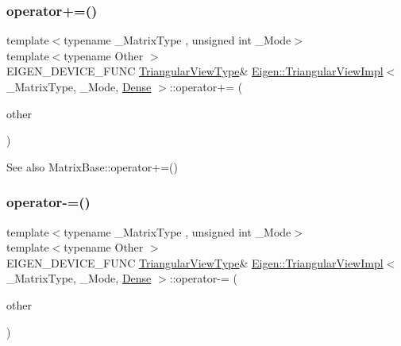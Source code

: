 \subsubsection{\texorpdfstring{operator+=()}{operator+=()}}
{\footnotesize\ttfamily template$<$typename \+\_\+\+Matrix\+Type , unsigned int \+\_\+\+Mode$>$ \\
template$<$typename Other $>$ \\
E\+I\+G\+E\+N\+\_\+\+D\+E\+V\+I\+C\+E\+\_\+\+F\+U\+NC \mbox{\hyperlink{class_eigen_1_1_triangular_view}{Triangular\+View\+Type}}\& \mbox{\hyperlink{class_eigen_1_1_triangular_view_impl}{Eigen\+::\+Triangular\+View\+Impl}}$<$ \+\_\+\+Matrix\+Type, \+\_\+\+Mode, \mbox{\hyperlink{struct_eigen_1_1_dense}{Dense}} $>$\+::operator+= (\begin{DoxyParamCaption}\item[{const \mbox{\hyperlink{class_eigen_1_1_dense_base}{Dense\+Base}}$<$ Other $>$ \&}]{other }\end{DoxyParamCaption})\hspace{0.3cm}{\ttfamily [inline]}}

\begin{DoxySeeAlso}{See also}
Matrix\+Base\+::operator+=() 
\end{DoxySeeAlso}
\mbox{\label{class_eigen_1_1_triangular_view_impl_3_01___matrix_type_00_01___mode_00_01_dense_01_4_a9cc4a65490e86eb0cc0d7f764782eeb6}} 
\subsubsection{\texorpdfstring{operator-\/=()}{operator-=()}}
{\footnotesize\ttfamily template$<$typename \+\_\+\+Matrix\+Type , unsigned int \+\_\+\+Mode$>$ \\
template$<$typename Other $>$ \\
E\+I\+G\+E\+N\+\_\+\+D\+E\+V\+I\+C\+E\+\_\+\+F\+U\+NC \mbox{\hyperlink{class_eigen_1_1_triangular_view}{Triangular\+View\+Type}}\& \mbox{\hyperlink{class_eigen_1_1_triangular_view_impl}{Eigen\+::\+Triangular\+View\+Impl}}$<$ \+\_\+\+Matrix\+Type, \+\_\+\+Mode, \mbox{\hyperlink{struct_eigen_1_1_dense}{Dense}} $>$\+::operator-\/= (\begin{DoxyParamCaption}\item[{const \mbox{\hyperlink{class_eigen_1_1_dense_base}{Dense\+Base}}$<$ Other $>$ \&}]{other }\end{DoxyParamCaption})\hspace{0.3cm}{\ttfamily [inline]}}

